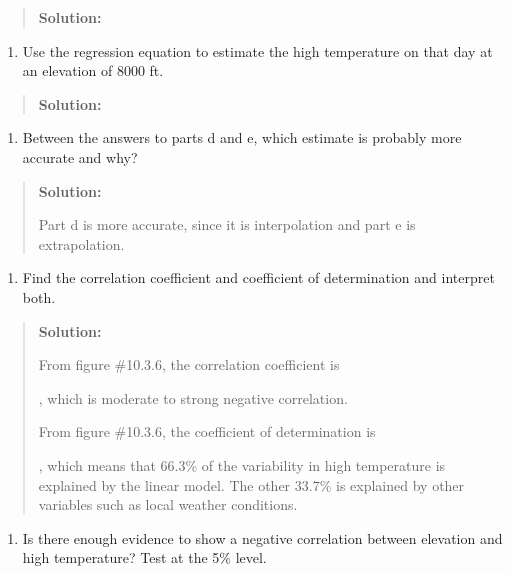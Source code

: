 \documentclass[]{book}
\providecommand{\tightlist}{%
  \setlength{\itemsep}{0pt}\setlength{\parskip}{0pt}}
\begin{document}
\begin{quote}
\textbf{Solution:}
\end{quote}

\begin{enumerate}
\def\labelenumi{\alph{enumi}.}
\setcounter{enumi}{4}
\tightlist
\item
  Use the regression equation to estimate the high temperature on that
  day at an elevation of 8000 ft.
\end{enumerate}

\begin{quote}
\textbf{Solution:}
\end{quote}

\begin{enumerate}
\def\labelenumi{\alph{enumi}.}
\setcounter{enumi}{5}
\tightlist
\item
  Between the answers to parts d and e, which estimate is probably
  more accurate and why?
\end{enumerate}

\begin{quote}
\textbf{Solution:}

Part d is more accurate, since it is interpolation and part e is
extrapolation.
\end{quote}

\begin{enumerate}
\def\labelenumi{\alph{enumi}.}
\setcounter{enumi}{6}
\tightlist
\item
  Find the correlation coefficient and coefficient of determination
  and interpret both.
\end{enumerate}

\begin{quote}
\textbf{Solution:}

From figure \#10.3.6, the correlation coefficient is

, which is moderate to strong negative correlation.

From figure \#10.3.6, the coefficient of determination is

, which means that 66.3\% of the variability in high temperature is
explained by the linear model. The other 33.7\% is explained by other
variables such as local weather conditions.
\end{quote}

\begin{enumerate}
\def\labelenumi{\alph{enumi}.}
\setcounter{enumi}{7}
\tightlist
\item
  Is there enough evidence to show a negative correlation between
  elevation and high temperature? Test at the 5\% level.
\end{enumerate}
\end{document}
